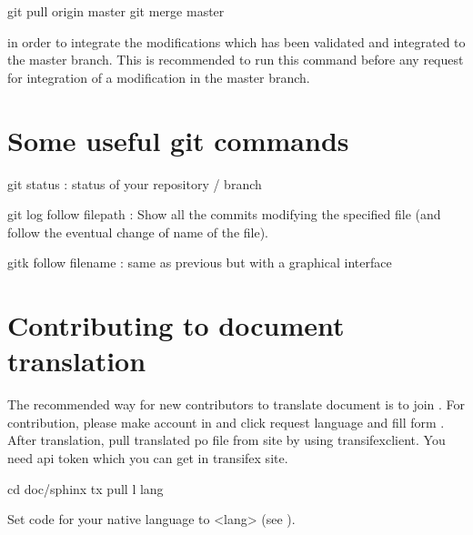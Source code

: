 \documentclass[a4paper,11pt,english]{sphinxmanual}
\begin{document}
\begin{sphinxVerbatim}[commandchars=\\\{\}]
git pull origin master
git merge master
\end{sphinxVerbatim}

in order to integrate the modifications which has been validated and integrated to the master branch. This is recommended to run this command before any request for integration of a modification in the master branch.


\section{Some useful git commands}
\label{\detokenize{project/contribute:some-useful-git-commands}}
\begin{sphinxVerbatim}[commandchars=\\\{\}]
git status  : status of your repository / branch

git log \PYGZhy{}\PYGZhy{}follow \PYGZdq{}filepath\PYGZdq{}   : Show all the commits modifying the specified file (and follow the eventual change of name of the file).

gitk \PYGZhy{}\PYGZhy{}follow filename : same as previous but with a graphical interface
\end{sphinxVerbatim}


\section{Contributing to document translation}
\label{\detokenize{project/contribute:contributing-to-document-translation}}
The recommended way for new contributors to translate document is to join  . For contribution, please make account in  and click request language and fill form . After translation, pull translated po file from site by using transifex\sphinxhyphen{}client. You need api token which you can get in transifex site.

\begin{sphinxVerbatim}[commandchars=\\\{\}]
cd doc/sphinx
tx pull \PYGZhy{}l \PYGZlt{}lang\PYGZgt{}
\end{sphinxVerbatim}

Set code for your native language to \textless{}lang\textgreater{} (see  ).
\end{document}

